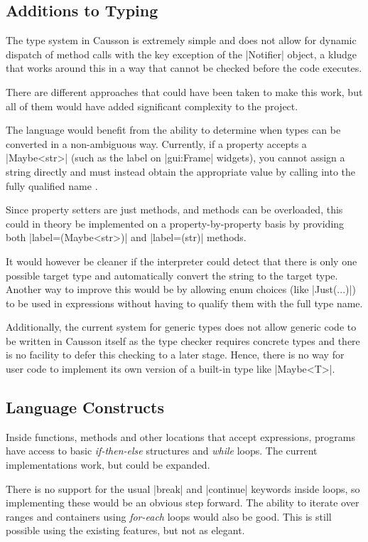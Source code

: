 \documentclass[11pt]{report}
\begin{document}
\subsection{Additions to Typing}

The type system in Causson is extremely simple and does not allow for dynamic dispatch of method calls with the key exception of the |Notifier| object, a kludge that works around this in a way that cannot be checked before the code executes.

There are different approaches that could have been taken to make this work, but all of them would have added significant complexity to the project.

The language would benefit from the ability to determine when types can be converted in a non-ambiguous way. Currently, if a property accepts a |Maybe<str>| (such as the label on |gui:Frame| widgets), you cannot assign a string directly and must instead obtain the appropriate value by calling into the fully qualified name .

Since property setters are just methods, and methods can be overloaded, this could in theory be implemented on a property-by-property basis by providing both |label=(Maybe<str>)| and |label=(str)| methods.

It would however be cleaner if the interpreter could detect that there is only one possible target type and automatically convert the string to the target type. Another way to improve this would be by allowing enum choices (like |Just(...)|) to be used in expressions without having to qualify them with the full type name.

Additionally, the current system for generic types does not allow generic code to be written in Causson itself as the type checker requires concrete types and there is no facility to defer this checking to a later stage. Hence, there is no way for user code to implement its own version of a built-in type like |Maybe<T>|.

\subsection{Language Constructs}

Inside functions, methods and other locations that accept expressions, programs have access to basic \emph{if-then-else} structures and \emph{while} loops. The current implementations work, but could be expanded.

There is no support for the usual |break| and |continue| keywords inside loops, so implementing these would be an obvious step forward. The ability to iterate over ranges and containers using \emph{for-each} loops would also be good. This is still possible using the existing features, but not as elegant.
\end{document}

